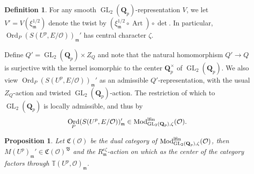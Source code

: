 \documentclass[leqno]{amsart}
\newcommand{\TT}{\mathbb{T}} %
\newcommand{\lfMod}{\textnormal{Mod}^{\textnormal{lfin}}}
\newcommand{\B}{\mathfrak B}
\newcommand{\fC}{\mathfrak{C}}
\DeclareMathOperator{\Ord}{Ord}
\DeclareMathOperator{\Art}{Art}
\DeclareMathOperator{\GL}{GL}
\newcommand{\Qp}{\mathbf{Q}_p}
\newcommand{\oo}{\mathcal{O}} %
\newcommand{\fm}{\mathfrak{m}}
\newtheorem{prop}[thm]{Proposition}
\theoremstyle{definition}
\newtheorem{defn}[thm]{Definition}
\theoremstyle{remark}
\begin{document}
\begin{defn}\label{def:twist}
	For any smooth $\GL_2(\Qp)$-representation
	$V$,
	we let $V'=V(\xi_{\fm}^{1/2})$
	denote the twist 
	by $(\xi_{\fm}^{1/2}\circ\Art)\circ \det$.
	In particular, 
	$\Ord_P(S(U^p,E/\oo))_{\fm}'$
	has central character $\zeta$.

	Define $Q'=\GL_2(\Qp)\times Z_Q$
	and note that the natural 
	homomorphism  $Q'\to Q$
	is surjective with the kernel
	isomorphic to the center  $\Qp^\times$
	of  $\GL_2(\Qp)$.
	We also view
	$\Ord_P(S(U^p,E/\oo))_{\fm}'$
	as an admissible $Q'$-representation,
	with the usual $Z_Q$-action
	and twisted $\GL_2(\Qp)$-action.
	The restriction of which to $\GL_2(\Qp)$
	is locally admissible,
	and thus by \cite[Thm 2.3.8]{emeI}
	\[
		\Ord_P(S(U^p,E/\oo))_{\fm}'\in \lfMod_{\GL_2(\Qp),\zeta}(\oo).
	\]
\end{defn}


\begin{prop}\label{prop:compatibility}
	Let $\fC(\oo)$ be the dual category of 
	$\lfMod_{\GL_2(\Qp),\zeta}(\oo)$, then 
	$M(U^p)_{\fm}'\in \fC(\oo)^{\B}$
	and the $R_\fm^{\epsilon\zeta}$-action on which
	as the center of the category
	factors through $\TT(U^p,\oo)_\fm$.
\end{prop}
\end{document}
